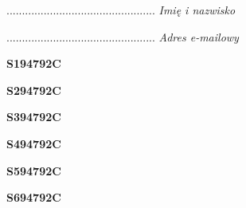 \begin{turn}{90}\begin{minipage}{\linewidth} \vspace{20mm} ................................................  \textit{Imię i nazwisko}\end{minipage}\end{turn}

\begin{turn}{90}\begin{minipage}{\linewidth} \vspace{20mm} ................................................  \textit{Adres e-mailowy}\end{minipage}\end{turn}

\begin{turn}{90}\huge \begin{minipage}{\linewidth} \vspace{10mm}\textbf{S194792C}\end{minipage}\end{turn}

\begin{turn}{90}\huge \begin{minipage}{\linewidth} \vspace{10mm}\textbf{S294792C}\end{minipage}\end{turn}

\begin{turn}{90}\huge \begin{minipage}{\linewidth} \vspace{10mm}\textbf{S394792C}\end{minipage}\end{turn}

\begin{turn}{90}\huge \begin{minipage}{\linewidth} \vspace{10mm}\textbf{S494792C}\end{minipage}\end{turn}

\begin{turn}{90}\huge \begin{minipage}{\linewidth} \vspace{10mm}\textbf{S594792C}\end{minipage}\end{turn}

\begin{turn}{90}\huge \begin{minipage}{\linewidth} \vspace{10mm}\textbf{S694792C}\end{minipage}\end{turn}

